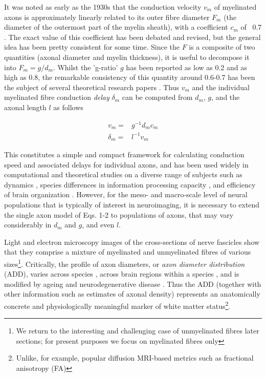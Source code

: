 It was noted as early as the 1930s that the conduction velocity $v_m$ of myelinated axons is approximately linearly related to its outer fibre diameter $F_m$ (the diameter of the outermost part of the myelin sheath), with a coefficient $c_m$ of ~0.7  . The exact value of this coefficient has been debated and revised, but the general idea has been pretty consistent for some time. Since the $F$ is a composite of two quantities (axonal diameter and myelin thickness), it is useful to decompose it into $F_m = g/d_m$. Whilst the 'g-ratio' $g$ has been reported as low as 0.2 and as high as 0.8, the remarkable consistency of this quantity around 0.6-0.7 has been the subject of several theoretical research papers 
. Thus $v_m$ and the individual myelinated fibre conduction \textit{delay} $\delta_m$ can be computed from $d_m$, $g$, and the axonal length $l$ as follows

\begin{eqnarray}
v_m      =& g^{-1} d_m c_m \\
\delta_m =& l^{-1} v_m
\end{eqnarray}




This constitutes a simple and compact framework for calculating conduction speed and associated delays for individual axons, and has been used widely in computational and theoretical studies on a diverse range of subjects such as dynamics , species differences in information processing capacity , and efficiency of brain organization . However, for the meso- and macro-scale level of neural populations that is typically of interest in neuroimaging, it is necessary to extend the single axon model of Eqs. 1-2 to  populations of axons, that may vary considerably in $d_m$ and $g$, and even $l$. 

Light and electron microscopy images of the cross-sections of nerve fascicles show that they comprise a mixture of myelinated and unmyelinated fibres of various sizes\footnote{We return to the interesting and challenging case of unmyelinated fibres later sections; for present purposes we focus on myelinated fibres only}. Critically, the profile of axon diameters, or \textit{axon diameter distribution} (ADD), varies across species , across brain regions within a species , and is modified by ageing and neurodegenerative disease . Thus the ADD (together with other information such as estimates of axonal density) represents an anatomically concrete and physiologically meaningful marker of white matter status\footnote{Unlike, for example, popular diffusion MRI-based metrics such as fractional anisotropy (FA)}. 

